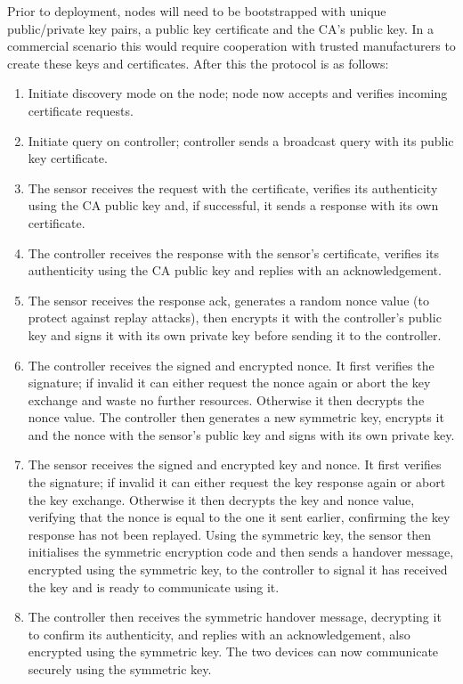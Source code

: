 \documentclass{mpaper}
\begin{document}
Prior to deployment, nodes will need to be bootstrapped with unique public/private key pairs, a public key certificate and the CA's public key. In a commercial scenario this would require cooperation with trusted manufacturers to create these keys and certificates. After this the protocol is as follows:
\begin{enumerate}
  \item Initiate discovery mode on the node; node now accepts and verifies incoming certificate requests.
  \item Initiate query on controller; controller sends a broadcast query with its public key certificate.
  \item The sensor receives the request with the certificate, verifies its authenticity using the CA public key and, if successful, it sends a response with its own certificate.
  \item The controller receives the response with the sensor's certificate, verifies its authenticity using the CA public key and replies with an acknowledgement.
  \item The sensor receives the response ack, generates a random nonce value (to protect against replay attacks), then encrypts it with the controller's public key and signs it with its own private key before sending it to the controller.
  \item The controller receives the signed and encrypted nonce. It first verifies the signature; if invalid it can either request the nonce again or abort the key exchange and waste no further resources. Otherwise it then decrypts the nonce value. The controller then generates a new symmetric key, encrypts it and the nonce with the sensor's public key and signs with its own private key.
  \item The sensor receives the signed and encrypted key and nonce. It first verifies the signature; if invalid it can either request the key response again or abort the key exchange. Otherwise it then decrypts the key and nonce value, verifying that the nonce is equal to the one it sent earlier, confirming the key response has not been replayed. Using the symmetric key, the sensor then initialises the symmetric encryption code and then sends a handover message, encrypted using the symmetric key, to the controller to signal it has received the key and is ready to communicate using it.
  \item The controller then receives the symmetric handover message, decrypting it to confirm its authenticity, and replies with an acknowledgement, also encrypted using the symmetric key. The two devices can now communicate securely using the symmetric key.
\end{enumerate} 
\end{document}
